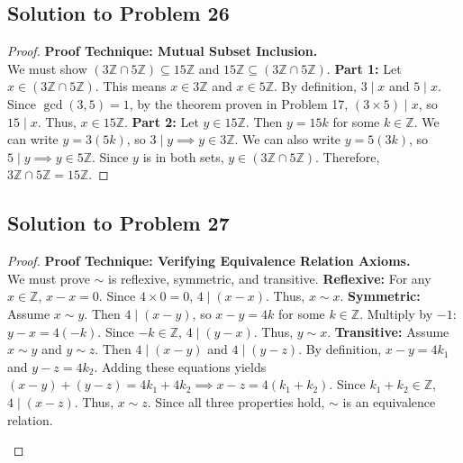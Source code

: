 \documentclass[12pt]{article}
\begin{document}
\subsection{Solution to Problem 26}
\begin{proof}
\textbf{Proof Technique: Mutual Subset Inclusion.} \\
We must show $(3\mathbb{Z} \cap 5\mathbb{Z}) \subseteq 15\mathbb{Z}$ and $15\mathbb{Z} \subseteq (3\mathbb{Z} \cap 5\mathbb{Z})$.
\textbf{Part 1:} Let $x \in (3\mathbb{Z} \cap 5\mathbb{Z})$. This means $x \in 3\mathbb{Z}$ and $x \in 5\mathbb{Z}$. By definition, $3 \mid x$ and $5 \mid x$. Since $\gcd(3, 5) = 1$, by the theorem proven in Problem 17, $(3 \times 5) \mid x$, so $15 \mid x$. Thus, $x \in 15\mathbb{Z}$.
\textbf{Part 2:} Let $y \in 15\mathbb{Z}$. Then $y = 15k$ for some $k \in \mathbb{Z}$. We can write $y = 3(5k)$, so $3 \mid y \implies y \in 3\mathbb{Z}$. We can also write $y = 5(3k)$, so $5 \mid y \implies y \in 5\mathbb{Z}$. Since $y$ is in both sets, $y \in (3\mathbb{Z} \cap 5\mathbb{Z})$.
Therefore, $3\mathbb{Z} \cap 5\mathbb{Z} = 15\mathbb{Z}$.
\end{proof}

\subsection{Solution to Problem 27}
\begin{proof}
\textbf{Proof Technique: Verifying Equivalence Relation Axioms.} \\
We must prove $\sim$ is reflexive, symmetric, and transitive.
\textbf{Reflexive:} For any $x \in \mathbb{Z}$, $x - x = 0$. Since $4 \times 0 = 0$, $4 \mid (x - x)$. Thus, $x \sim x$.
\textbf{Symmetric:} Assume $x \sim y$. Then $4 \mid (x - y)$, so $x - y = 4k$ for some $k \in \mathbb{Z}$. Multiply by $-1$: $y - x = 4(-k)$. Since $-k \in \mathbb{Z}$, $4 \mid (y - x)$. Thus, $y \sim x$.
\textbf{Transitive:} Assume $x \sim y$ and $y \sim z$. Then $4 \mid (x - y)$ and $4 \mid (y - z)$. By definition, $x - y = 4k_1$ and $y - z = 4k_2$. Adding these equations yields $(x - y) + (y - z) = 4k_1 + 4k_2 \implies x - z = 4(k_1 + k_2)$. Since $k_1 + k_2 \in \mathbb{Z}$, $4 \mid (x - z)$. Thus, $x \sim z$.
Since all three properties hold, $\sim$ is an equivalence relation.

\begin{center}
\end{center}
\end{proof}
\end{document}
